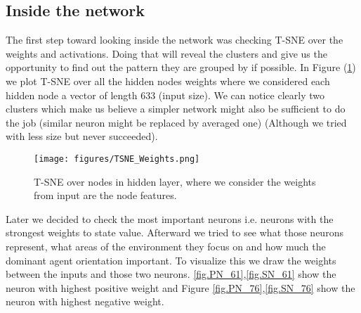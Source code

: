 \documentclass{article}
\begin{document}
\subsection{Inside the network}
The first step toward looking inside the network was checking T-SNE over the weights and activations. Doing that will reveal the clusters and give us the opportunity to find out the pattern they are grouped by if possible. In Figure (\ref{fig.TSNE_Weights}) we plot T-SNE over all the hidden nodes weights where we considered each hidden node a vector of length 633 (input size). We can notice clearly two clusters which make us believe a simpler network might also be sufficient to do the job (similar neuron might be replaced by averaged one) (Although we tried with less size but never succeeded).
\begin{figure}[H]
\texttt{[image: figures/TSNE\_Weights.png]}
\caption{T-SNE over nodes in hidden layer, where we consider the weights from input are the node features.}
\label{fig.TSNE_Weights}
\end{figure}

Later we decided to check the most important neurons i.e. neurons with the strongest weights to state value. Afterward we tried to see what those neurons represent, what areas of the environment they focus on and how much the dominant agent orientation important. To visualize this we draw the weights between the inputs and those two neurons. \ref{fig.PN_61},\ref{fig.SN_61} show the neuron with highest positive weight and Figure \ref{fig.PN_76},\ref{fig.SN_76} show the neuron with highest negative weight.  
\end{document}
